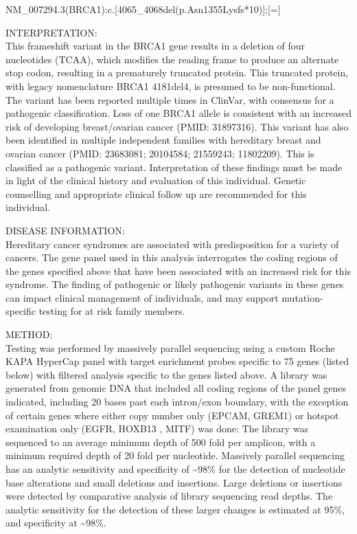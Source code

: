 \documentclass[10pt]{article}
\begin{document}
NM\_007294.3(BRCA1):c.[4065\_4068del(p.Asn1355Lysfs*10)];[=]

INTERPRETATION: \\
This frameshift variant in the BRCA1 gene results in a deletion of four nucleotides (TCAA), which modifies the reading frame to produce an alternate stop codon, resulting in a prematurely truncated protein. This truncated protein, with legacy nomenclature BRCA1 4181del4, is presumed to be non-functional. The variant has been reported multiple times in ClinVar, with consensus for a pathogenic classification. Loss of one BRCA1 allele is consistent with an increased risk of developing breast/ovarian cancer (PMID: 31897316). This variant has also been identified in multiple independent families with hereditary breast and ovarian cancer (PMID: 23683081; 20104584; 21559243; 11802209). This is classified as a pathogenic variant.
Interpretation of these findings must be made in light of the clinical history and evaluation of this individual. Genetic counselling and appropriate clinical follow up are recommended for this individual.

DISEASE INFORMATION: \\
Hereditary cancer syndromes are associated with predisposition for a variety of cancers. The gene panel used in this analysis interrogates the coding regions of the genes specified above that have been associated with an increased risk for this syndrome. The finding of pathogenic or likely pathogenic variants in these genes can impact clinical management of individuals, and may support mutation-specific testing for at risk family members.

METHOD: \\
Testing was performed by massively parallel sequencing using a custom Roche KAPA HyperCap panel with target enrichment probes specific to 75 genes (listed below) with filtered analysis specific to the genes listed above. A library was generated from genomic DNA that included all coding regions of the panel genes indicated, including 20 bases past each intron/exon boundary, with the exception of certain genes where either copy number only (EPCAM, GREM1) or hotspot examination only (EGFR, HOXB13 , MITF) was done: The library was sequenced to an average minimum depth of 500 fold per amplicon, with a minimum required depth of 20 fold per nucleotide. Massively parallel sequencing has an analytic sensitivity and specificity of \textasciitilde 98\% for the detection of nucleotide base alterations and small deletions and insertions. Large deletions or insertions were detected by comparative analysis of library sequencing read depths. The analytic sensitivity for the detection of these larger changes is estimated at 95\%, and specificity at \textasciitilde 98\%.
\end{document}

